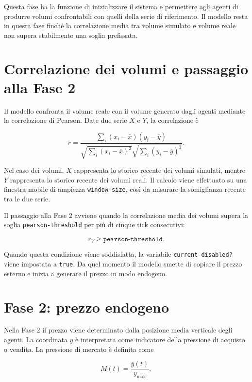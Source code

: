Questa fase ha la funzione di inizializzare il sistema e permettere agli agenti
di produrre volumi confrontabili con quelli della serie di riferimento. Il
modello resta in questa fase finché la correlazione media tra volume simulato e
volume reale non supera stabilmente una soglia prefissata.

\section{Correlazione dei volumi e passaggio alla Fase 2}

Il modello confronta il volume reale con il volume generato dagli agenti mediante
la correlazione di Pearson. Date due serie \(X\) e \(Y\), la correlazione è

\begin{equation}
    r =
    \frac{
    \sum_i (x_i-\bar{x})(y_i-\bar{y})
    }{
    \sqrt{\sum_i (x_i-\bar{x})^2}
    \sqrt{\sum_i (y_i-\bar{y})^2}
    }.
\end{equation}

Nel caso dei volumi, \(X\) rappresenta lo storico recente dei volumi simulati,
mentre \(Y\) rappresenta lo storico recente dei volumi reali. Il calcolo viene
effettuato su una finestra mobile di ampiezza \texttt{window-size}, così da
misurare la somiglianza recente tra le due serie.

Il passaggio alla Fase 2 avviene quando la correlazione media dei volumi supera
la soglia \texttt{pearson-threshold} per più di cinque tick consecutivi:

\begin{equation}
    \overline{r}_V \geq \texttt{pearson-threshold}.
\end{equation}

Quando questa condizione viene soddisfatta, la variabile
\texttt{current-disabled?} viene impostata a \texttt{true}. Da quel momento il
modello smette di copiare il prezzo esterno e inizia a generare il prezzo in modo
endogeno.

\section{Fase 2: prezzo endogeno}

Nella Fase 2 il prezzo viene determinato dalla posizione media verticale degli
agenti. La coordinata \(y\) è interpretata come indicatore della pressione di
acquisto o vendita. La pressione di mercato è definita come

\begin{equation}
    M(t)=\frac{\bar{y}(t)}{y_{\max}},
\end{equation}

